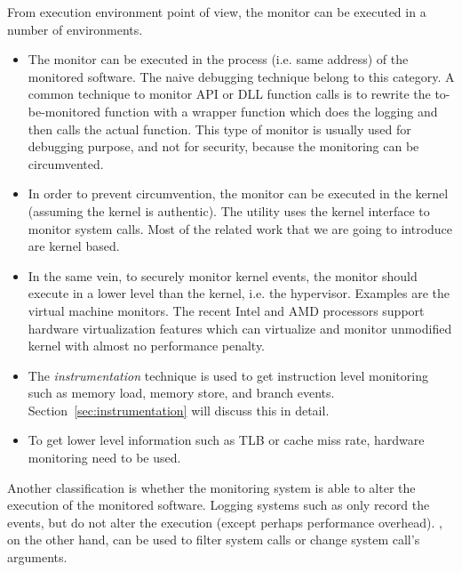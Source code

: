  From execution environment point of view, the monitor can be executed
in a number of environments.
\begin{itemize}
\item The monitor can be executed in the process (i.e. same address)
of the monitored software.
The naive  debugging technique belong to this category.
A common technique to monitor API or DLL function calls is to rewrite
the to-be-monitored function with a wrapper function which does the
logging and then calls the actual function.
This type of monitor is usually used for debugging purpose, and not for
security, because the monitoring can be circumvented.
\item In order to prevent circumvention,
the monitor can be executed in the kernel (assuming the kernel is authentic).
The  utility uses the kernel  interface
to monitor system calls.
Most of the related work that we are going to introduce are kernel based.
\item In the same vein, to securely monitor kernel events, the monitor
should execute in a lower level than the kernel, i.e. the hypervisor.
Examples are the virtual machine monitors.
The recent Intel and AMD processors support hardware virtualization
features which can virtualize and monitor unmodified kernel with almost
no performance penalty.
\item The {\em instrumentation} technique is used to get instruction
level monitoring such as memory load, memory store, and branch events.
Section~\ref{sec:instrumentation} will discuss this in detail.
\item To get lower level information such as TLB or cache miss rate,
hardware monitoring need to be used.
\end{itemize}

Another classification is whether the monitoring system is able to
alter the execution of the monitored software.
Logging systems such as  only record the events,
but do not alter the execution (except perhaps performance overhead).
, on the other hand, can be used to filter system calls
or change system call's arguments.

